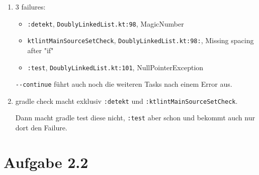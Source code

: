 \documentclass{article}
\begin{document}
\begin{enumerate}[label=\alph*)]
  Für \texttt{:distTar} und \texttt{:startScripts} haben wir uns von Gemini helfen lassen.

  \item %
  3 failures:

  \begin{itemize}
    \item \texttt{:detekt}, \texttt{DoublyLinkedList.kt:98}, MagicNumber
    \item \texttt{ktlintMainSourceSetCheck}, \texttt{DoublyLinkedList.kt:98:}, Missing spacing after "if"
    \item \texttt{:test}, \texttt{DoublyLinkedList.kt:101}, NullPointerException
  \end{itemize}

  \texttt{-{-}continue} führt auch noch die weiteren Tasks nach einem Error aus.

  \item %
  gradle check macht exklusiv \texttt{:detekt} und \texttt{:ktlintMainSourceSetCheck}.

  Dann macht gradle test diese nicht, \texttt{:test} aber schon und bekommt auch nur dort den Failure.
\end{enumerate}

\section*{Aufgabe 2.2}
\label{sec:a22}
\end{document}
